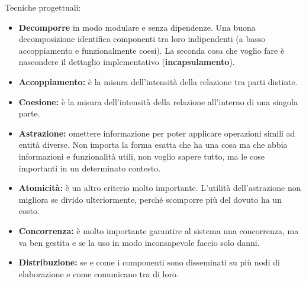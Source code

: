 Tecniche progettuali:
\begin{itemize}
	\item \textbf{Decomporre} in modo modulare e senza dipendenze. Una buona decomposizione identifica componenti tra loro indipendenti (a basso accoppiamento e funzionalmente coesi). La seconda cosa che voglio fare è nascondere il dettaglio implementativo (\textbf{incapsulamento}).
	\item\textbf{Accoppiamento:} è la misura dell'intensità della relazione tra parti distinte.
	\item\textbf{Coesione:} è la misura dell'intensità della relazione all'interno di una singola parte.
	\item\textbf{Astrazione:} omettere informazione per poter applicare operazioni simili ad entità diverse. Non importa la forma esatta che ha una cosa ma che abbia informazioni e funzionalità  utili, non voglio sapere tutto, ma le cose importanti in un determinato contesto.
	\item\textbf{Atomicità:} è un altro criterio molto importante. L'utilità  dell'astrazione non migliora se divido ulteriormente, perché scomporre più del dovuto ha un costo.
	\item\textbf{Concorrenza:} è molto importante garantire al sistema una concorrenza, ma va ben gestita e se la uso in modo inconsapevole faccio solo danni.
	\item\textbf{Distribuzione:} se e come i componenti sono disseminati su più nodi di elaborazione e come comunicano tra di loro.
\end{itemize}


